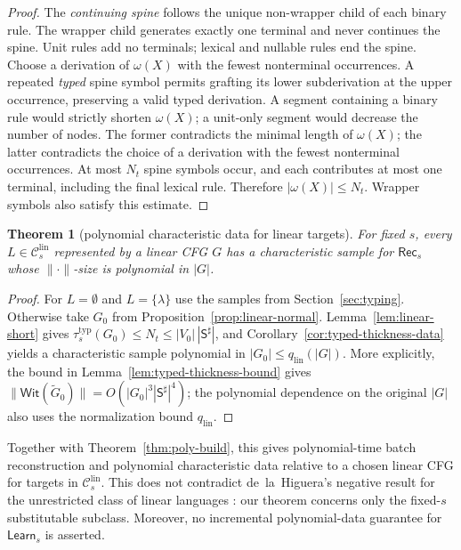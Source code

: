 \documentclass[11pt,a4paper]{article}
\newtheorem{theorem}{Theorem}[section]
\theoremstyle{remark}
\theoremstyle{plain}
\newcommand{\WitnessSet}{\mathsf{Wit}}
\newcommand{\lin}{\mathrm{lin}}
\newcommand{\Clin}[1]{\mathcal C_{#1}^{\lin}}
\begin{document}
\begin{proof}
The \emph{continuing spine} follows the unique
non-wrapper child of each binary rule.
The wrapper child generates exactly one terminal
and never continues the spine. Unit rules add
no terminals; lexical and nullable rules end
the spine. Choose a derivation of $\omega(X)$
with the fewest nonterminal occurrences.
A repeated \emph{typed} spine symbol permits
grafting its lower subderivation at the upper
occurrence, preserving a valid typed derivation.
A segment containing a binary rule would strictly
shorten $\omega(X)$; a unit-only segment would
decrease the number of nodes. The former contradicts the minimal length of $\omega(X)$;
the latter contradicts the choice of a derivation with the fewest
nonterminal occurrences.
At most $N_t$ spine symbols occur, and each contributes
at most one terminal, including the final lexical rule.
Therefore $|\omega(X)|\le N_t$. Wrapper symbols
also satisfy this estimate.
\end{proof}

\begin{theorem}[polynomial characteristic data for linear targets]
\label{thm:linear-poly}
For fixed $s$, every $L\in\Clin{s}$ represented by a linear CFG $G$ has
a characteristic sample for $\mathsf{Rec}_s$ whose $\|\cdot\|$-size is
polynomial in $|G|$.
\end{theorem}

\begin{proof}
For $L=\emptyset$ and $L=\{\lambda\}$ use the samples from
Section~\ref{sec:typing}.  Otherwise take $G_0$ from
Proposition~\ref{prop:linear-normal}.  Lemma~\ref{lem:linear-short} gives
$\tau_s^{\mathrm{typ}}(G_0)\le N_t\le
|V_0|\,|\mathsf S^\sharp|$, and
Corollary~\ref{cor:typed-thickness-data} yields a characteristic sample
polynomial in $|G_0|\le q_{\mathrm{lin}}(|G|)$. More explicitly, the bound in
Lemma~\ref{lem:typed-thickness-bound} gives
$\|\WitnessSet(\widetilde G_0)\|=O(|G_0|^3|\mathsf S^\sharp|^4)$;
the polynomial dependence on the original $|G|$ also uses
the normalization bound $q_{\mathrm{lin}}$.
\end{proof}

Together with Theorem~\ref{thm:poly-build}, this gives
polynomial-time batch reconstruction and polynomial characteristic data
relative to a chosen linear CFG for targets in $\Clin{s}$.
This does not contradict de~la~Higuera's negative result for
the unrestricted class of linear languages
\cite[Theorem~2]{higuera1997}: our theorem concerns only the
fixed-$s$ substitutable subclass.  Moreover, no incremental
polynomial-data guarantee for $\mathsf{Learn}_s$ is asserted.
\end{document}
